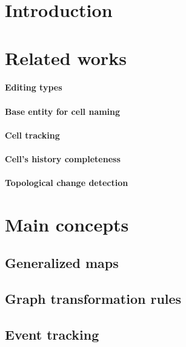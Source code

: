 \documentclass[preprint,review,12pt,x11names]{elsarticle}
\begin{document}

\section{Introduction}%
\label{sec:introduction}


\section{Related works}%
\label{sec:related-works}

\paragraph{Editing types}

\paragraph{Base entity for cell naming}

\paragraph{Cell tracking}

\paragraph{Cell's history completeness}

\paragraph{Topological change detection}



\section{Main concepts}%
\label{sec:main-concepts}

\subsection{Generalized maps}%
\label{sec:generalized-maps}

\subsection{Graph transformation rules}%
\label{sec:graph-transf-rules}

\subsection{Event tracking}%
\label{sec:event-tracking}
\end{document}
